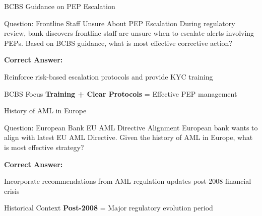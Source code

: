 \documentclass{beamer}
\begin{document}
\begin{frame}{BCBS Guidance on PEP Escalation}
\begin{block}{Question: Frontline Staff Unsure About PEP Escalation}
\small{During regulatory review, bank discovers frontline staff are unsure when to escalate alerts involving PEPs. Based on BCBS guidance, what is most effective corrective action?}
\end{block}

\vspace{0.3cm}
\textcolor{correct}{\textbf{Correct Answer:}}
\begin{center}
\Large{Reinforce risk-based escalation protocols and provide KYC training}
\end{center}

\begin{block}{BCBS Focus}
\textbf{Training + Clear Protocols} = Effective PEP management
\end{block}
\end{frame}

\begin{frame}{History of AML in Europe}
\begin{block}{Question: European Bank EU AML Directive Alignment}
\small{European bank wants to align with latest EU AML Directive. Given the history of AML in Europe, what is most effective strategy?}
\end{block}

\vspace{0.3cm}
\textcolor{correct}{\textbf{Correct Answer:}}
\begin{center}
\Large{Incorporate recommendations from AML regulation updates post-2008 financial crisis}
\end{center}

\begin{block}{Historical Context}
\textbf{Post-2008} = Major regulatory evolution period
\end{block}
\end{frame}
\end{document}
